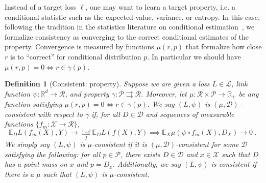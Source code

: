 \documentclass[11pt]{article} %
\newcommand{\Comments}{1}
\newcommand{\mytodo}[2]{\ifnum\Comments=1%
	\todo[linecolor=#1!80!black,backgroundcolor=#1,bordercolor=#1!80!black]{#2}\fi}
\newcommand{\raft}[1]{\mytodo{green!20!white}{RF: #1}}
\newcommand{\botodo}[1]{\mytodo{blue!20!white}{[Bo: #1]}}
\newcommand{\btw}[1]{}%
\newcommand{\reals}{\mathbb{R}}
\newcommand{\propdis}{\mu}
\newcommand{\D}{\mathcal{D}}
\newcommand{\E}{\mathbb{E}}
\renewcommand{\L}{\mathcal{L}}
\newcommand{\R}{\mathcal{R}}
\renewcommand{\P}{\mathcal{P}}
\newcommand{\X}{\mathcal{X}}
\newcommand{\Y}{\mathcal{Y}}
\newcommand{\Ind}[1]{\mathbf{I}\{{#1}\}}
\newcommand{\toto}{\rightrightarrows}
\newtheorem{definition}{Definition}
\begin{document}


Instead of a target loss $\ell$, one may want to learn a target property, i.e. a conditional statistic such as the expected value, variance, or entropy.
In this case, following the tradition in the statistics literature on conditional estimation~\citep{gyorfi2006distribution,fan1998efficient,ruppert1997local},
we formalize consistency as converging to the correct conditional estimates of the property.
Convergence is measured by functions $\propdis(r, p)$ that formalize how close $r$ is to ``correct'' for conditional distribution $p$.
In particular we should have $\propdis(r,p) = 0 \iff r \in \gamma(p)$.
\btw{Bo: Would be nice to give some natural special cases: for a finite property, $\propdis(r,p) = \Ind{r \in \gamma(p)}$, and for single-valued properties with a distance metric on $\R$, $\propdis(r,p) = \text{dist}(r, \gamma(p))$.}

\begin{definition}[Consistent: property]\label{def:consistent-prop}
	Suppose we are given a loss $L \in \L$, link function $\psi: \reals^d \to \R$, and property $\gamma:\P \toto \R$.
	Moreover, let $\propdis : \R \times \P \to \reals_+$ be any function satisfying $\propdis(r,p) = 0 \iff r \in \gamma(p)$.
	We say $(L, \psi)$ is \emph{$(\propdis, \D)$-consistent with respect to} $\gamma$ if, for all $D \in \D$ and sequences of measurable functions $\{f_m: \X \to \R\}$, 
	\begin{equation}
	\E_{D} L(f_m(X), Y) \to \inf_f \E_{D} L( f(X), Y) \implies \E_X \propdis(\psi \circ f_m(X), D_X) \to 0~.~
	\end{equation}
	We simply say $(L,\psi)$ is \emph{$\propdis$-consistent} if it is $(\propdis,\D)$-consistent for some $\D$ satisfying the following: for all $p \in \P$, there exists $D \in \D$ and $x \in \X$ such that $D$ has a point mass on $x$ and $p = D_x$.
	Additionally, we say $(L,\psi)$ is \emph{consistent} if there is a $\propdis$ such that $(L,\psi)$ is $\propdis$-consistent.
\end{definition}
\end{document}
